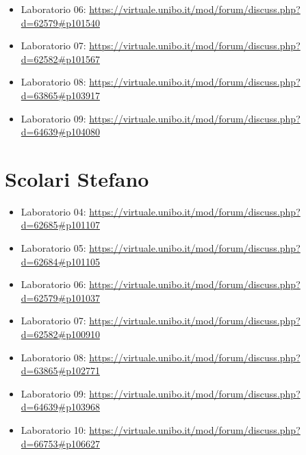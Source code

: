 \documentclass[a4paper,12pt]{report}
\begin{document}
\begin{itemize}
 \item Laboratorio 06: \url{https://virtuale.unibo.it/mod/forum/discuss.php?d=62579#p101540}
 \item Laboratorio 07: \url{https://virtuale.unibo.it/mod/forum/discuss.php?d=62582#p101567}
 \item Laboratorio 08: \url{https://virtuale.unibo.it/mod/forum/discuss.php?d=63865#p103917}
 \item Laboratorio 09: \url{https://virtuale.unibo.it/mod/forum/discuss.php?d=64639#p104080}
\end{itemize}


\section{Scolari Stefano}

\begin{itemize}
 \item Laboratorio 04: \url{https://virtuale.unibo.it/mod/forum/discuss.php?d=62685#p101107}
 \item Laboratorio 05: \url{https://virtuale.unibo.it/mod/forum/discuss.php?d=62684#p101105}
 \item Laboratorio 06: \url{https://virtuale.unibo.it/mod/forum/discuss.php?d=62579#p101037}
 \item Laboratorio 07: \url{https://virtuale.unibo.it/mod/forum/discuss.php?d=62582#p100910}
 \item Laboratorio 08: \url{https://virtuale.unibo.it/mod/forum/discuss.php?d=63865#p102771}
 \item Laboratorio 09: \url{https://virtuale.unibo.it/mod/forum/discuss.php?d=64639#p103968}
 \item Laboratorio 10: \url{https://virtuale.unibo.it/mod/forum/discuss.php?d=66753#p106627}
\end{itemize}
\end{document}
